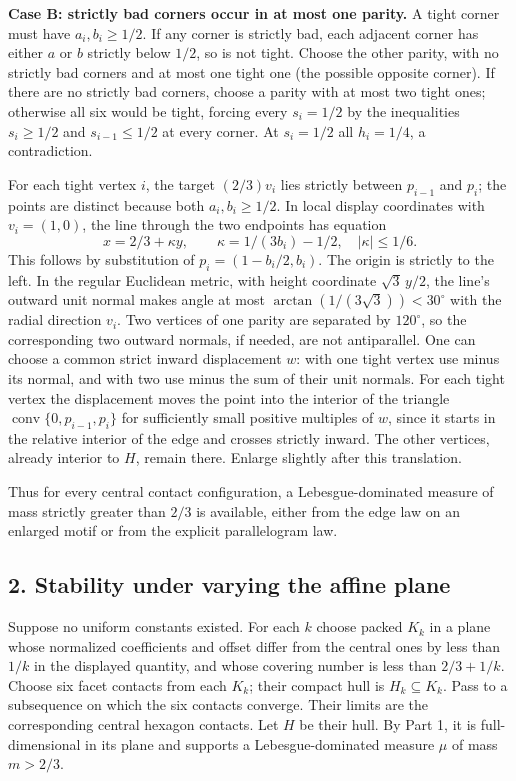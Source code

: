 \documentclass[
  10pt,
]{article}
\begin{document}
\textbf{Case B: strictly bad corners occur in at most one parity.} A
tight corner must have \(a_i,b_i\ge1/2\). If any corner is strictly bad,
each adjacent corner has either \(a\) or \(b\) strictly below \(1/2\),
so is not tight. Choose the other parity, with no strictly bad corners
and at most one tight one (the possible opposite corner). If there are
no strictly bad corners, choose a parity with at most two tight ones;
otherwise all six would be tight, forcing every \(s_i=1/2\) by the
inequalities \(s_i\ge1/2\) and \(s_{i-1}\le1/2\) at every corner. At
\(s_i=1/2\) all \(h_i=1/4\), a contradiction.

For each tight vertex \(i\), the target \((2/3)v_i\) lies strictly
between \(p_{i-1}\) and \(p_i\); the points are distinct because both
\(a_i,b_i\ge1/2\). In local display coordinates with \(v_i=(1,0)\), the
line through the two endpoints has equation \[
 x=2/3+\kappa y,\qquad\kappa=1/(3b_i)-1/2,\quad |\kappa|\le1/6.
\] This follows by substitution of \(p_i=(1-b_i/2,b_i)\). The origin is
strictly to the left. In the regular Euclidean metric, with height
coordinate \(\sqrt3\,y/2\), the line's outward unit normal makes angle
at most \(\arctan(1/(3\sqrt3))<30^\circ\) with the radial direction
\(v_i\). Two vertices of one parity are separated by \(120^\circ\), so
the corresponding two outward normals, if needed, are not antiparallel.
One can choose a common strict inward displacement \(w\): with one tight
vertex use minus its normal, and with two use minus the sum of their
unit normals. For each tight vertex the displacement moves the point
into the interior of the triangle
\(\operatorname{conv}\{0,p_{i-1},p_i\}\) for sufficiently small positive
multiples of \(w\), since it starts in the relative interior of the edge
and crosses strictly inward. The other vertices, already interior to
\(H\), remain there. Enlarge slightly after this translation.

Thus for every central contact configuration, a Lebesgue-dominated
measure of mass strictly greater than \(2/3\) is available, either from
the edge law on an enlarged motif or from the explicit parallelogram
law.

\subsection{2. Stability under varying the affine
plane}\label{stability-under-varying-the-affine-plane}

Suppose no uniform constants existed. For each \(k\) choose packed
\(K_k\) in a plane whose normalized coefficients and offset differ from
the central ones by less than \(1/k\) in the displayed quantity, and
whose covering number is less than \(2/3+1/k\). Choose six facet
contacts from each \(K_k\); their compact hull is \(H_k\subseteq K_k\).
Pass to a subsequence on which the six contacts converge. Their limits
are the corresponding central hexagon contacts. Let \(H\) be their hull.
By Part 1, it is full-dimensional in its plane and supports a
Lebesgue-dominated measure \(\mu\) of mass \(m>2/3\).
\end{document}
